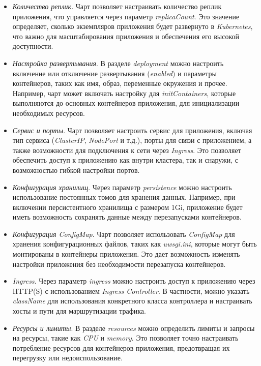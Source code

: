 \begin{itemize}
    \item \textit{Количество реплик}. Чарт позволяет настраивать количество реплик приложения, что управляется через параметр \textit{replicaCount}. Это значение определяет, сколько экземпляров приложения будет развернуто в \textit{Kubernetes}, что важно для масштабирования приложения и обеспечения его высокой доступности.

    \item \textit{Настройка развертывания}. В разделе \textit{deployment} можно настроить включение или отключение развертывания (\textit{enabled}) и параметры контейнеров, таких как имя, образ, переменные окружения и прочее. Например, чарт может включать настройку для \textit{initContainers}, которые выполняются до основных контейнеров приложения, для инициализации необходимых ресурсов.

    \item \textit{Сервис и порты}. Чарт позволяет настроить сервис для приложения, включая тип сервиса (\textit{ClusterIP}, \textit{NodePort} и т.д.), порты для связи с приложением, а также возможности для подключения к сети через \textit{Ingress}. Это позволяет обеспечить доступ к приложению как внутри кластера, так и снаружи, с возможностью гибкой настройки портов.

    \item \textit{Конфигурация хранилищ}. Через параметр \textit{persistence} можно настроить использование постоянных томов для хранения данных. Например, при включении персистентного хранилища с размером 1Gi, приложение будет иметь возможность сохранять данные между перезапусками контейнеров.

    \item \textit{Конфигурация \textit{ConfigMap}}. Чарт позволяет использовать \textit{ConfigMap} для хранения конфигурационных файлов, таких как \textit{uwsgi.ini}, которые могут быть монтированы в контейнеры приложения. Это дает возможность изменять настройки приложения без необходимости перезапуска контейнеров.

    \item \textit{Ingress}. Через параметр \textit{ingress} можно настроить доступ к приложению через HTTP(S) с использованием \textit{Ingress Controller}. В частности, можно указать \textit{className} для использования конкретного класса контроллера и настраивать хосты и пути для маршрутизации трафика.

    \item \textit{Ресурсы и лимиты}. В разделе \textit{resources} можно определить лимиты и запросы на ресурсы, такие как \textit{CPU} и \textit{memory}. Это позволяет точно настраивать потребление ресурсов для контейнеров приложения, предотвращая их перегрузку или недоиспользование.


\end{itemize}
